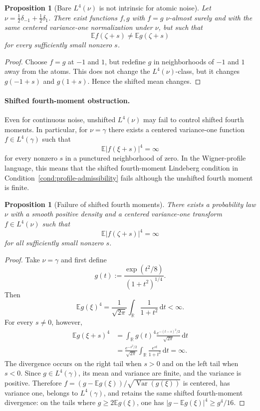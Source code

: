 \documentclass[11pt]{article}
\newtheorem{proposition}[theorem]{Proposition}
\theoremstyle{definition}
\theoremstyle{remark}
\newcommand{\E}{\mathbb E}
\newcommand{\Var}{\operatorname{Var}}
\newcommand{\dd}{\mathrm d}
\begin{document}
\begin{proposition}[Bare \(L^4(\nu)\) is not intrinsic for atomic noise]
Let \(\nu=\frac12\delta_{-1}+\frac12\delta_1\).  There exist functions \(f,g\) with \(f=g\) \(\nu\)-almost surely and with the same centered variance-one normalization under \(\nu\), but such that
\[
        \E f(\zeta+s)\ne \E g(\zeta+s)
\]
for every sufficiently small nonzero \(s\).
\end{proposition}

\begin{proof}
Choose \(f=g\) at \(-1\) and \(1\), but redefine \(g\) in neighborhoods of \(-1\) and \(1\) away from the atoms.  This does not change the \(L^4(\nu)\)-class, but it changes \(g(-1+s)\) and \(g(1+s)\).  Hence the shifted mean changes.
\end{proof}

\paragraph{Shifted fourth-moment obstruction.}

Even for continuous noise, unshifted \(L^4(\nu)\) may fail to control shifted fourth moments.  In particular, for \(\nu=\gamma\) there exists a centered variance-one function \(f\in L^4(\gamma)\) such that
\[
        \E|f(\xi+s)|^4=\infty
\]
for every nonzero \(s\) in a punctured neighborhood of zero.  In the Wigner-profile language, this means that the shifted fourth-moment Lindeberg condition in Condition~\ref{cond:profile-admissibility} fails although the unshifted fourth moment is finite.

\begin{proposition}[Failure of shifted fourth moments]
There exists a probability law \(\nu\) with a smooth positive density and a centered variance-one transform \(f\in L^4(\nu)\) such that
\[
        \E|f(\zeta+s)|^4=\infty
\]
for all sufficiently small nonzero \(s\).
\end{proposition}

\begin{proof}
Take $\nu=\gamma$ and first define
\[
 g(t):=\frac{\exp(t^2/8)}{(1+t^2)^{1/4}}.
\]
Then
\[
 \E g(\xi)^4
 =\frac{1}{\sqrt{2\pi}}\int_{\mathbb R}\frac{1}{1+t^2}\,\dd t<\infty.
\]
For every $s\ne0$, however,
\begin{align*}
 \E g(\xi+s)^4
 &=\int_{\mathbb R}g(t)^4\frac{e^{-(t-s)^2/2}}{\sqrt{2\pi}}\,\dd t\\
 &=\frac{e^{-s^2/2}}{\sqrt{2\pi}}
   \int_{\mathbb R}\frac{e^{st}}{1+t^2}\,\dd t
 =\infty.
\end{align*}
The divergence occurs on the right tail when $s>0$ and on the left tail when
$s<0$.  Since $g\in L^4(\gamma)$, its mean and variance are finite, and the
variance is positive.  Therefore
$f=(g-\E g(\xi))/\sqrt{\Var(g(\xi))}$ is centered, has variance one, belongs to
$L^4(\gamma)$, and retains the same shifted fourth-moment divergence: on the
tails where $g\ge2\E g(\xi)$, one has
$|g-\E g(\xi)|^4\ge g^4/16$.
\end{proof}
\end{document}
